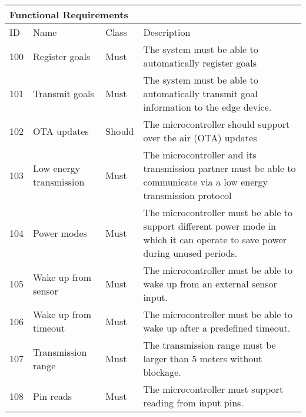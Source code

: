 \clearpage
\begin{table}[]
    \begin{tabular}[t]{ l p{2.4cm} l p{7.6cm}}
        \multicolumn{4}{l}{Functional Requirements}                                                                                                                                           \\ \hline
        ID  & Name                      & Class & Description                                                                                                                        \\ \hline
        100 & Register goals            & Must           & The system must be able to automatically register goals                                                                            \\
        101 & Transmit goals            & Must           & The system must be able to automatically transmit goal information to the edge device.                                             \\
        102 & OTA updates               & Should         & The microcontroller should support over the air (OTA) updates                                                                      \\
        103 & Low energy transmission   & Must           & The microcontroller and its  transmission partner must be able to communicate via a low energy transmission protocol               \\
        104 & Power modes               & Must           & The microcontroller must be able to support different power mode in which it can operate to save power during unused periods.      \\
        105 & Wake up from sensor       & Must           & The microcontroller must be able to wake up from an external sensor input.                                                         \\
        106 & Wake up from timeout      & Must           & The microcontroller must be able to wake up after a predefined timeout.                                                            \\
        107 & Transmission range        & Must           & The transmission range must be larger than 5 meters without blockage.                                                              \\
        108 & Pin reads                 & Must           & The microcontroller must support reading from input pins.                                                                          \\

\end{tabular}
\end{table}
